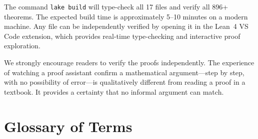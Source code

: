 \documentclass[11pt,openany]{book}
\theoremstyle{definition}
\theoremstyle{plain}
\theoremstyle{remark}
\begin{document}
The command \texttt{lake build} will type-check all 17 files and verify all 896+ theorems. The expected build time is approximately 5--10 minutes on a modern machine. Any file can be independently verified by opening it in the Lean~4 VS Code extension, which provides real-time type-checking and interactive proof exploration.

We strongly encourage readers to verify the proofs independently. The experience of watching a proof assistant confirm a mathematical argument---step by step, with no possibility of error---is qualitatively different from reading a proof in a textbook. It provides a certainty that no informal argument can match.

\chapter{Glossary of Terms}
\label{app:glossary}
\end{document}
